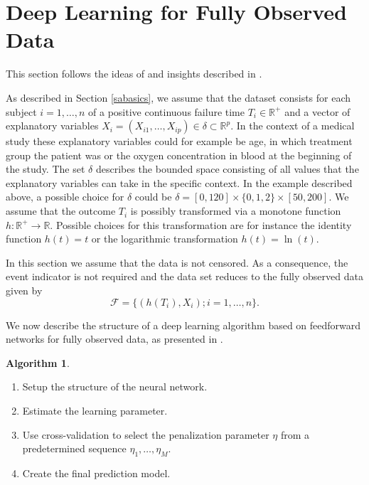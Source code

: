 \documentclass[12pt, a4paper]{scrartcl}
\theoremstyle{definition}
\newtheorem{Algorithm}{Algorithm}[section]
\theoremstyle{plain}
\numberwithin{equation}{section}
\numberwithin{figure}{section}
\numberwithin{table}{section}
\begin{document}
	\newpage
	
	\section{Deep Learning for Fully Observed Data} \label{uncensored}
	This section follows the ideas of \citet*{basearticle} and insights described in \citet*{deeplbook}.
	
	As described in Section \ref{sabasics}, we assume that the dataset consists for each subject $i = 1,\dots,n$ of a positive continuous failure time $T_i \in \mathbb{R}^+$ and a vector of explanatory variables $X_i = (X_{i1}, \dots , X_{ip}) \in \delta \subset \mathbb{R}^p$.
	In the context of a medical study these explanatory variables could for example be age, in which treatment group the patient was or the oxygen concentration in blood at the beginning of the study.
	The set $\delta$ describes the bounded space consisting of all values that the explanatory variables can take in the specific context.
	In the example described above, a possible choice for $\delta$ could be $\delta = [0, 120] \times \{0,1,2\} \times [50, 200]$.
	We assume that the outcome $T_i$ is possibly transformed via a monotone function $h: \mathbb{R}^+ \rightarrow \mathbb{R}$.
	Possible choices for this transformation are for instance the identity function $h(t)=t$ or the logarithmic transformation $h(t)= \ln (t)$.
	
	In this section we assume that the data is not censored.
	As a consequence, the event indicator is not required and the data set reduces to the fully observed data given by
	\begin{equation*}
	\mathcal{F} =\{ \left( h(T_i), X_i\right); i = 1, \dots, n\}.
	\end{equation*}
	
	We now describe the structure of a deep learning algorithm based on feedforward networks for fully observed data, as presented in \citet*{basearticle}.
	
	\begin{Algorithm}\label{alg:nocensor}
		~
	\begin{enumerate}
		\item Setup the structure of the neural network.
		\item Estimate the learning parameter.
		\item Use cross-validation to select the penalization parameter $\eta$ from a predetermined sequence $\eta_1,\dots,\eta_M$.
		\item Create the final prediction model.
	\end{enumerate}
	\end{Algorithm}
\end{document}
